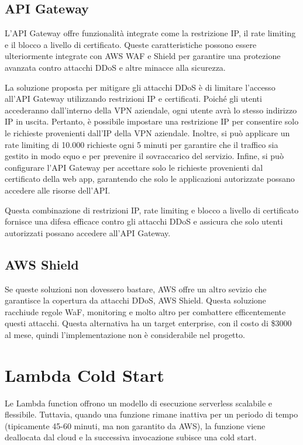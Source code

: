 \subsection{API Gateway}
L'API Gateway offre funzionalità integrate come la restrizione IP, il rate limiting e il blocco a livello di certificato. Queste caratteristiche possono essere ulteriormente integrate con AWS WAF e Shield per garantire una protezione avanzata contro attacchi DDoS e altre minacce alla sicurezza.

La soluzione proposta per mitigare gli attacchi DDoS è di limitare l'accesso all'API Gateway utilizzando restrizioni IP e certificati. Poiché gli utenti accederanno dall'interno della VPN aziendale, ogni utente avrà lo stesso indirizzo IP in uscita. Pertanto, è possibile impostare una restrizione IP per consentire solo le richieste provenienti dall'IP della VPN aziendale. Inoltre, si può applicare un rate limiting di 10.000 richieste ogni 5 minuti per garantire che il traffico sia gestito in modo equo e per prevenire il sovraccarico del servizio. Infine, si può configurare l'API Gateway per accettare solo le richieste provenienti dal certificato della web app, garantendo che solo le applicazioni autorizzate possano accedere alle risorse dell'API.

Questa combinazione di restrizioni IP, rate limiting e blocco a livello di certificato fornisce una difesa efficace contro gli attacchi DDoS e assicura che solo utenti autorizzati possano accedere all'API Gateway.

\subsection{AWS Shield}
Se queste soluzioni non dovessero bastare, AWS offre un altro sevizio che garantisce la copertura da attacchi DDoS, AWS Shield. Questa soluzione racchiude regole WaF, monitoring e molto altro per combattere efficentemente questi attacchi. Questa alternativa ha un target enterprise, con il costo di \$3000 al mese, quindi l'implementazione non è considerabile nel progetto. 

\section{Lambda Cold Start}
\label{lambda_cold_start}
Le Lambda function offrono un modello di esecuzione serverless scalabile e flessibile. Tuttavia, quando una funzione rimane inattiva per un periodo di tempo (tipicamente 45-60 minuti, ma non garantito da AWS), la funzione viene deallocata dal cloud e la successiva invocazione subisce una cold start.

